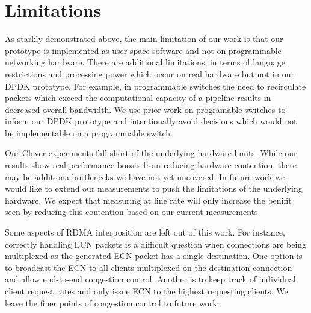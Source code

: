\section{Limitations}

As starkly demonstrated above, the main limitation of our work is that
our {\sword} prototype is implemented as user-space software and not
on programmable networking hardware. There are additional limitations,
in terms of language restrictions and processing power which occur on
real hardware but not in our DPDK prototype. For example, in
programmable switches the need to recirculate packets which exceed the
computational capacity of a pipeline results in decreased overall
bandwidth. We use prior work on programable switches to inform our
DPDK prototype and intentionally avoid decisions which would not be
implementable on a programmable switch.

Our Clover experiments fall short of the underlying hardware limits.
While our results show real performance boosts from reducing hardware
contention, there may be additiona bottlenecks we have not yet
uncovered. In future work we would like to extend our measurements to
push the limitations of the underlying hardware. We expect that
measuring at line rate will only increase the benifit seen by reducing
this contention based on our current
measurements.


Some aspects of RDMA interposition are left out of this work. For
instance, correctly handling ECN packets is a difficult question when
connections are being multiplexed as the generated ECN packet has a
single destination. One option is to broadcast the ECN to all clients
multiplexed on the destination connection and allow end-to-end
congestion control. Another is to keep track of individual client
request rates and only issue ECN to the highest requesting clients. We
leave the finer points of congestion control to future work.
